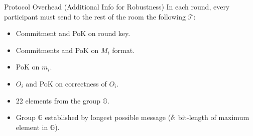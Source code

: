 \begin{frame}{Protocol Overhead (Additional Info for Robustness)}
    In each round, every participant must send to the rest of the room the following $\mathcal{T}$:
    \begin{itemize}
        \item Commitment and PoK on round key.
        \item Commitments and PoK on $M_i$ format.
        \item PoK on $m_i$.
        \item $O_i$ and PoK on correctness of $O_i$.
    \end{itemize}
    \begin{itemize}
        \item 22 elements from the group $\mathbb{G}$.
        \item Group $\mathbb{G}$ established by longest possible message ($\delta$: bit-length of maximum element in $\mathbb{G}$).
    \end{itemize}
    
\end{frame}


